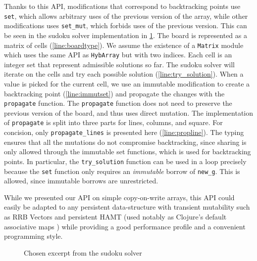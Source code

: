 Thanks to this API, modifications that correspond to backtracking points
use \lstinline/set/, which allows arbitrary uses of the previous version
of the array, while other modifications uses \lstinline/set_mut/, which
forbids uses of the previous version.
This can be seen in the sudoku solver implementation in \cref{ex:sudoku}.
The board is represented as a matrix of cells (\cref{line:boardtype}).
We assume the existence of a \lstinline/Matrix/ module which uses the same API
as \lstinline/HybArray/ but with two indices.
Each cell is an integer
set that represent admissible solutions so far. The sudoku solver will
iterate on the cells and try each possible solution (\cref{line:try_solution}).
When a value is picked for the current cell, we use an immutable modification
to create a backtracking point (\cref{line:immutset}) and propagate
the changes with the \lstinline/propagate/ function. The \lstinline/propagate/
function does not need to preserve the previous
version of the board, and thus uses direct mutation.
The implementation of \lstinline/propagate/ is split into three parts
for lines, columns, and square. For concision, only \lstinline/propagate_lines/ is
presented here (\cref{line:propline}).
The typing ensures that all the mutations do not compromise
backtracking, since sharing is only allowed through
the immutable set functions, which is used for backtracking points.
In particular, the \lstinline/try_solution/ function can be used in a loop
precisely because the \lstinline/set/ function only requires an
\emph{immutable} borrow of \lstinline/new_g/.
This is allowed, since immutable borrows are unrestricted.

While we presented our API on simple copy-on-write arrays, this API
could easily be adapted to any persistent data-structure with
transient mutability such as RRB Vectors \cite{DBLP:journals/pacmpl/Puente17}
and persistent HAMT (used notably as Clojure's default associative maps
\cite{bagwell2001ideal,clojurehamt}) while providing a good performance profile
and a convenient programming style.

\begin{figure}
  \centering
  \begin{minipage}[t]{0.45\linewidth}
    
  \end{minipage}\hfill
  \begin{minipage}[t]{0.54\linewidth}
    
  \end{minipage}
  \caption{Chosen excerpt from the sudoku solver}
  \label{ex:sudoku}
\end{figure}

